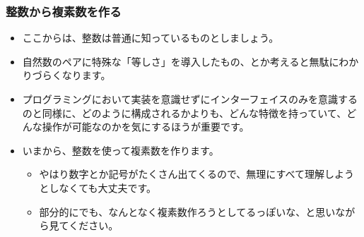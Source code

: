 \documentclass[dvipdfmx]{beamer}
\begin{document}
  \begin{frame}
    \frametitle{整数から複素数を作る}

    \begin{itemize}
      \item ここからは、整数は普通に知っているものとしましょう。
      \item 自然数のペアに特殊な「等しさ」を導入したもの、とか考えると無駄にわかりづらくなります。
      \item プログラミングにおいて実装を意識せずにインターフェイスのみを意識するのと同様に、どのように構成されるかよりも、どんな特徴を持っていて、どんな操作が可能なのかを気にするほうが重要です。
      \item いまから、整数を使って複素数を作ります。
      \begin{itemize}
        \item やはり数字とか記号がたくさん出てくるので、無理にすべて理解しようとしなくても大丈夫です。
        \item 部分的にでも、なんとなく複素数作ろうとしてるっぽいな、と思いながら見てください。
      \end{itemize}
    \end{itemize}

  \end{frame}
\end{document}
